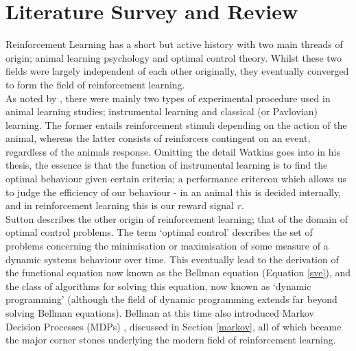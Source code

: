 \documentclass[12pt]{article}
\begin{document}
\section{Literature Survey and Review}\label{litrev}
Reinforcement Learning has a short but active history with two main threads of origin; animal learning psychology and optimal control theory. Whilst these two fields were largely independent of each other originally, they eventually converged to form the field of reinforcement learning. 
\\\newline As noted by \textcite{watkins1989learning}, there were mainly two types of experimental procedure used in animal learning studies; instrumental learning and classical (or Pavlovian) learning. The former entails reinforcement stimuli depending on the action of the animal, whereas the latter consists of reinforcers contingent on an event, regardless of the animals response. 
Omitting the detail Watkins goes into in his thesis, the essence is that the function of instrumental learning is to find the optimal behaviour given certain criteria; a performance critereon which allows us to judge the efficiency of our behaviour - in an animal this is decided internally, and in reinforcement learning this is our reward signal $r$.
\\\newline Sutton \autocite{Sutton2012-uz} describes the other origin of reinforcement learning; that of the domain of optimal control problems. The term `optimal control' describes the set of problems concerning the minimisation or maximisation of some measure of a dynamic systems behaviour over time. This eventually lead to the derivation of the functional equation now known as the Bellman equation (Equation \ref{sve}), and the class of algorithms for solving this equation, now known as `dynamic programming' (although the field of dynamic programming extends far beyond solving Bellman equations). Bellman at this time also introduced Markov Decision Processes (MDPs) \autocite{bellman1957markovian}, discussed in Section \ref{markov}, all of which became the major corner stones underlying the modern field of reinforcement learning.
\end{document}
